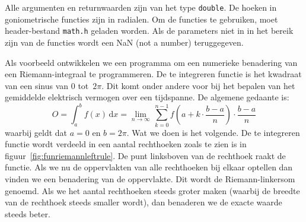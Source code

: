 Alle argumenten en returnwaarden zijn van het type \texttt{double}. De hoeken in goniometrische functies zijn in radialen. Om de functies te gebruiken, moet header-bestand \texttt{math.h} geladen worden. Als de parameters niet in in het bereik zijn van de functies wordt een NaN (not a number) teruggegeven.

Als voorbeeld ontwikkelen we een programma om een numerieke benadering van een Riemann-integraal te programmeren. De te integreren functie is het kwadraat van een sinus van 0 tot~$2\pi$. Dit komt onder andere voor bij het bepalen van het gemiddelde elektrisch vermogen over een tijdspanne. De algemene gedaante is:
%
\begin{equation}
O = \int_{a}^{b}f(x)\,\mathrm{d}x = \lim\limits_{n\to\infty}\,\sum_{k=0}^{n-1}f\left(a+k\cdot\frac{b-a}{n}\right)\cdot\frac{b-a}{n}
\end{equation}
%
waarbij geldt dat $a=0$ en $b=2\pi$. Wat we doen is het volgende. De te integreren functie wordt verdeeld in een aantal rechthoeken zoals te zien is in figuur~\ref{fig:funriemannleftrule}. De punt linksboven van de rechthoek raakt de functie. Als we nu de oppervlakten van alle rechthoeken bij elkaar optellen dan vinden we een benadering van de oppervlakte. Dit wordt de Riemann-linkersom genoemd. Als we het aantal rechthoeken steeds groter maken (waarbij de breedte van de rechthoek steeds smaller wordt), dan benaderen we de exacte waarde steeds beter.

